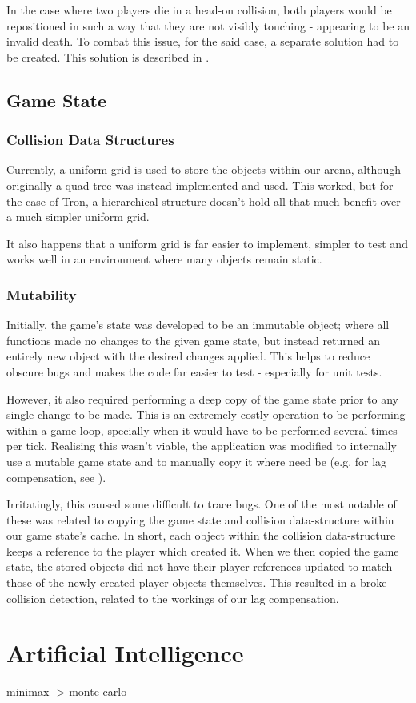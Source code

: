 \documentclass{standalone}
\begin{document}
			In the case where two players die in a head-on collision, both players would be repositioned in such a way that they are not visibly touching - appearing to be an invalid death. To combat this issue, for the said case, a separate solution had to be created. This solution is described in .

		\subsection{Game State}
			\subsubsection{Collision Data Structures}
				Currently, a uniform grid is used to store the objects within our arena, although originally a quad-tree was instead implemented and used. This worked, but for the case of Tron, a hierarchical structure doesn't hold all that much benefit over a much simpler uniform grid.

				It also happens that a uniform grid is far easier to implement, simpler to test and works well in an environment where many objects remain static.

			\subsubsection{Mutability}
				Initially, the game's state was developed to be an immutable object; where all functions made no changes to the given game state, but instead returned an entirely new object with the desired changes applied. This helps to reduce obscure bugs and makes the code far easier to test - especially for unit tests.

				However, it also required performing a deep copy of the game state prior to any single change to be made. This is an extremely costly operation to be performing within a game loop, specially when it would have to be performed several times per tick. Realising this wasn't viable, the application was modified to internally use a mutable game state and to manually copy it where need be (e.g. for lag compensation, see ).

				Irritatingly, this caused some difficult to trace bugs. One of the most notable of these was related to copying the game state and collision data-structure within our game state's cache. In short, each object within the collision data-structure keeps a reference to the player which created it. When we then copied the game state, the stored objects did not have their player references updated to match those of the newly created player objects themselves. This resulted in a broke collision detection, related to the workings of our lag compensation.

	\section{Artificial Intelligence}
		minimax -> monte-carlo
\end{document}
